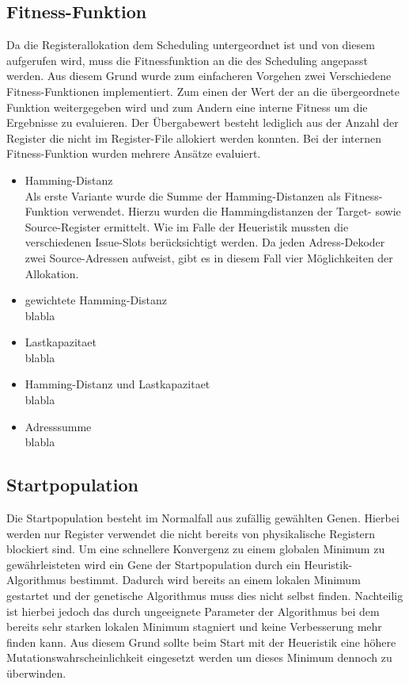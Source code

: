 \subsection{Fitness-Funktion}
Da die Registerallokation dem Scheduling untergeordnet ist und von diesem aufgerufen wird, muss die Fitnessfunktion an die des Scheduling angepasst werden. Aus diesem Grund wurde zum einfacheren Vorgehen zwei Verschiedene Fitness-Funktionen implementiert. Zum einen der Wert der an die übergeordnete Funktion weitergegeben wird und zum Andern eine interne Fitness um die Ergebnisse zu evaluieren.
Der Übergabewert besteht lediglich aus der Anzahl der Register die nicht im Register-File allokiert werden konnten. Bei der internen Fitness-Funktion wurden mehrere Ansätze evaluiert.
\begin{itemize}
	\item Hamming-Distanz\\
		Als erste Variante wurde die Summe der Hamming-Distanzen als Fitness-Funktion verwendet. Hierzu wurden die Hammingdistanzen der Target- sowie Source-Register ermittelt. Wie im Falle der Heueristik mussten die verschiedenen Issue-Slots berücksichtigt werden. Da jeden Adress-Dekoder zwei Source-Adressen aufweist, gibt es in diesem Fall vier Möglichkeiten der Allokation.
	\item gewichtete Hamming-Distanz\\
		blabla
	\item Lastkapazitaet\\
		blabla
	\item Hamming-Distanz und Lastkapazitaet\\
		blabla
	\item Adresssumme\\
		blabla
\end{itemize}
 
\subsection{Startpopulation}
Die Startpopulation besteht im Normalfall aus zufällig gewählten Genen. Hierbei werden nur Register verwendet die nicht bereits von physikalische Registern blockiert sind.
Um eine schnellere Konvergenz zu einem globalen Minimum zu gewährleisteten wird ein Gene der Startpopulation durch ein Heuristik-Algorithmus bestimmt. Dadurch wird bereits an einem lokalen Minimum gestartet und der genetische Algorithmus muss dies nicht selbst finden. 
Nachteilig ist hierbei jedoch das durch ungeeignete Parameter der Algorithmus bei dem bereits sehr starken lokalen Minimum stagniert und keine Verbesserung mehr finden kann. Aus diesem Grund sollte beim Start mit der Heueristik eine höhere Mutationswahrscheinlichkeit eingesetzt werden um dieses Minimum dennoch zu überwinden.

